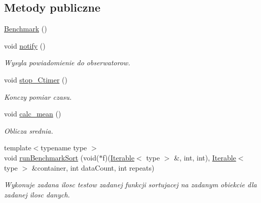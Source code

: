 \subsection*{Metody publiczne}
\begin{DoxyCompactItemize}
\item 
\hyperlink{class_benchmark_acfca497989836a688d44477802e822d8}{Benchmark} ()
\item 
void \hyperlink{class_benchmark_a408a44a1d64e45b647ef6dbba2f2c3d3}{notify} ()
\begin{DoxyCompactList}\small\item\em Wysyla powiadomienie do obserwatorow. \end{DoxyCompactList}\item 
void \hyperlink{class_benchmark_ab65889d4c2df3eb503048ab1cc6e7413}{stop\-\_\-\-Ctimer} ()
\begin{DoxyCompactList}\small\item\em Konczy pomiar czasu. \end{DoxyCompactList}\item 
void \hyperlink{class_benchmark_ac4d5360d2850510913efe07cf957f4c1}{calc\-\_\-mean} ()
\begin{DoxyCompactList}\small\item\em Oblicza srednia. \end{DoxyCompactList}\item 
{\footnotesize template$<$typename type $>$ }\\void \hyperlink{class_benchmark_ad5d8a563d9b9163758ae04d064cc38cb}{run\-Benchmark\-Sort} (void($\ast$f)(\hyperlink{class_iterable}{Iterable}$<$ type $>$ \&, int, int), \hyperlink{class_iterable}{Iterable}$<$ type $>$ \&container, int data\-Count, int repeats)
\begin{DoxyCompactList}\small\item\em Wykonuje zadana ilosc testow zadanej funkcji sortujacej na zadanym obiekcie dla zadanej ilosc danych. \end{DoxyCompactList}\end{DoxyCompactItemize}
